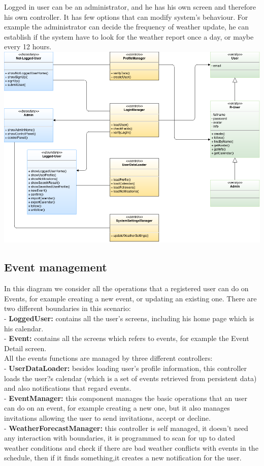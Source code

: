 \documentclass[12pt]{book}
\begin{document}
Logged in user can be an administrator, and he has his own screen and therefore his own controller. It has few options that can modify system's behaviour.
For example the administrator can decide the frequency of weather update, he can establish if the system have to look for the weather report once a day, or maybe every 12 hours.\\

\vspace{2cm}
\includegraphics[scale=0.4]{signup_login}\\

\newpage
\subsection{Event management}
In this diagram we consider all the operations that a registered user can do on Events, for example creating a new event, or updating an existing one.
There are two different boundaries in this scenario:\\
- \textbf{LoggedUser: }contains all the user's screens, including his home page which is his calendar.\\
- \textbf{Event:} contains all the screens which refers to events, for example the Event Detail screen.\\

All the events functions are managed by three different controllers:\\
- \textbf{UserDataLoader: }besides loading user's profile information, this controller loads the user?s calendar (which is a set of events retrieved from persistent data) and also notifications that regard events.\\
- \textbf{EventManager: }this component manages the basic operations that an user can do on an event, for example creating a new one, but it also manages invitations allowing the user to send invitations, accept or decline.\\
- \textbf{WeatherForecastManager: }this controller is self managed, it doesn't need any interaction with boundaries, it is programmed to scan for up to dated weather conditions and check if there are bad weather conflicts with events in the schedule, then if it finds something,it creates a new notification for the user.\\
\end{document}
